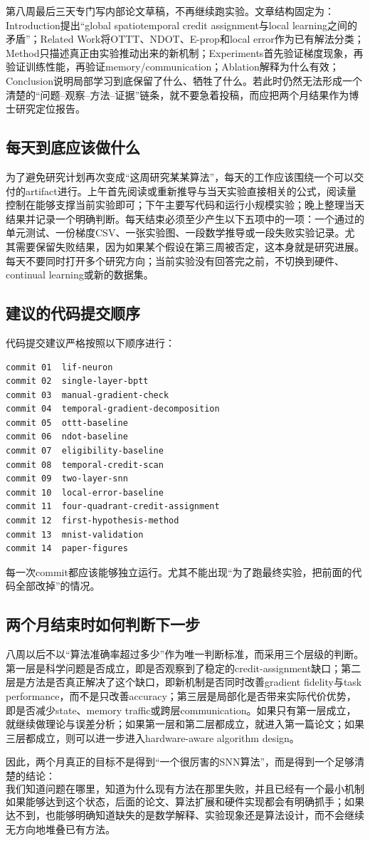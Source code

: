 \documentclass[journal,12pt,onecolumn]{IEEEtran}
\begin{document}
第八周最后三天专门写内部论文草稿，不再继续跑实验。文章结构固定为：Introduction提出“global spatiotemporal credit assignment与local learning之间的矛盾”；Related Work将OTTT、NDOT、E-prop和local error作为已有解法分类；Method只描述真正由实验推动出来的新机制；Experiments首先验证梯度现象，再验证训练性能，再验证memory/communication；Ablation解释为什么有效；Conclusion说明局部学习到底保留了什么、牺牲了什么。若此时仍然无法形成一个清楚的“问题--观察--方法--证据”链条，就不要急着投稿，而应把两个月结果作为博士研究定位报告。

\subsection{每天到底应该做什么}

为了避免研究计划再次变成“这周研究某某算法”，每天的工作应该围绕一个可以交付的artifact进行。上午首先阅读或重新推导与当天实验直接相关的公式，阅读量控制在能够支撑当前实验即可；下午主要写代码和运行小规模实验；晚上整理当天结果并记录一个明确判断。每天结束必须至少产生以下五项中的一项：一个通过的单元测试、一份梯度CSV、一张实验图、一段数学推导或一段失败实验记录。尤其需要保留失败结果，因为如果某个假设在第三周被否定，这本身就是研究进展。每天不要同时打开多个研究方向；当前实验没有回答完之前，不切换到硬件、continual learning或新的数据集。

\subsection{建议的代码提交顺序}

代码提交建议严格按照以下顺序进行：
\begin{verbatim}
commit 01  lif-neuron
commit 02  single-layer-bptt
commit 03  manual-gradient-check
commit 04  temporal-gradient-decomposition
commit 05  ottt-baseline
commit 06  ndot-baseline
commit 07  eligibility-baseline
commit 08  temporal-credit-scan
commit 09  two-layer-snn
commit 10  local-error-baseline
commit 11  four-quadrant-credit-assignment
commit 12  first-hypothesis-method
commit 13  mnist-validation
commit 14  paper-figures
\end{verbatim}
每一次commit都应该能够独立运行。尤其不能出现“为了跑最终实验，把前面的代码全部改掉”的情况。

\subsection{两个月结束时如何判断下一步}

八周以后不以“算法准确率超过多少”作为唯一判断标准，而采用三个层级的判断。第一层是科学问题是否成立，即是否观察到了稳定的credit-assignment缺口；第二层是方法是否真正解决了这个缺口，即新机制是否同时改善gradient fidelity与task performance，而不是只改善accuracy；第三层是局部化是否带来实际代价优势，即是否减少state、memory traffic或跨层communication。如果只有第一层成立，就继续做理论与误差分析；如果第一层和第二层都成立，就进入第一篇论文；如果三层都成立，则可以进一步进入hardware-aware algorithm design。

因此，两个月真正的目标不是得到“一个很厉害的SNN算法”，而是得到一个足够清楚的结论：
\begin{equation}
\boxed{
\text{我们知道问题在哪里，知道为什么现有方法在那里失败，并且已经有一个最小机制能够针对性地改善它。}
}
\end{equation}
如果能够达到这个状态，后面的论文、算法扩展和硬件实现都会有明确抓手；如果达不到，也能够明确知道缺失的是数学解释、实验现象还是算法设计，而不会继续无方向地堆叠已有方法。



\end{document}
